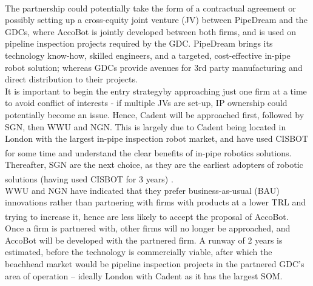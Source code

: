 \documentclass[11pt]{article}		%
\newcommand{\supercite}[1]{\textsuperscript{\cite{#1}}}		%
\begin{document}
        \\ 
	    \hspace*{2ex}The partnership could potentially take the form of a contractual agreement or possibly setting up a cross-equity joint venture (JV) between PipeDream and the GDCs, where AccoBot is jointly developed between both firms, and is used on pipeline inspection projects required by the GDC. PipeDream brings its technology know-how, skilled engineers, and a targeted, cost-effective in-pipe robot solution; whereas GDCs provide avenues for 3rd party manufacturing and direct distribution to their projects. 
        \\
        \hspace*{2ex}It is important to begin the entry strategyby approaching just one firm at a time to avoid conflict of interests - if multiple JVs are set-up, IP ownership could potentially become an issue. Hence, Cadent will be approached first, followed by SGN, then WWU and NGN. This is largely due to Cadent being located in London with the largest in-pipe inspection robot market, and have used CISBOT for some time and understand the clear benefits of in-pipe robotics solutions\supercite{cadentbot}. Thereafter, SGN are the next choice, as they are the earliest adopters of robotic solutions (having used CISBOT for 3 years)\supercite{SGNbot} .
        \\
        \hspace*{2ex}WWU and NGN have indicated that they prefer business-as-usual (BAU) innovations rather than partnering with firms with products at a lower TRL and trying to increase it\supercite{NGNbot}\supercite{WWUbot}, hence are less likely to accept the proposal of AccoBot. 
        \\
        \hspace*{2ex}Once a firm is partnered with, other firms will no longer be approached, and AccoBot will be developed with the partnered firm. A runway of 2 years is estimated, before the technology is commercially viable, after which the beachhead market would be pipeline inspection projects in the partnered GDC’s area of operation – ideally London with Cadent as it has the largest SOM. 
    
\end{document}
